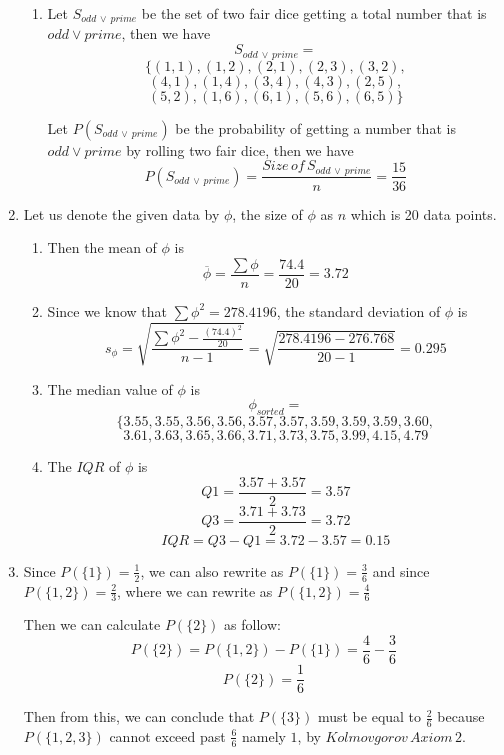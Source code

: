 \documentclass[12pt]{article}
\begin{document}
\begin{enumerate}
\begin{enumerate}
		\item Let $S_{odd \, \lor \, prime}$ be the set of two fair dice getting a total number that is $odd \lor prime$, then we have
		$$S_{odd \, \lor \, prime} =$$ 
		$$\{(1,1), (1,2), (2,1), (2,3), (3,2),$$		
		$$(4,1), (1,4),(3,4), (4,3), (2,5),$$
		$$(5,2), (1,6), (6,1), (5,6),(6,5)\}$$
		
		Let $P(S_{odd \, \lor \, prime})$ be the probability of getting a number that is $odd \lor prime$ by rolling two fair dice, then we have
		$$P(S_{odd \, \lor \, prime}) = \frac{Size \, of \, S_{odd \, \lor \, prime}}{n} = \frac{15}{36}$$
		
	\end{enumerate}
	
	\item Let us denote the given data by $\phi$, the size of $\phi$ as $n$ which is 20 data points.
	
	\begin{enumerate}
	
		\item Then the mean of $\phi$ is
		$$\overline{\phi} = \frac{\sum \phi}{n} = \frac{74.4}{20} = 3.72$$
		
		\item Since we know that $\sum \phi^{2} = 278.4196$, the standard deviation of $\phi$ is
		$$s_{\phi} = \sqrt{\frac{\sum \phi^{2} - \frac{(74.4)^2}{20}}{n-1}}= \sqrt{\frac{278.4196 - 276.768}{20-1}} = 0.295$$
		
		\item The median value of $\phi$ is
		$$\phi_{sorted} =$$	
		$$\{3.55, 3.55, 3.56, 3.56, 3.57, 3.57, 3.59, 3.59, 3.59, 3.60,$$
		$$3.61, 3.63, 3.65, 3.66, 3.71, 3.73, 3.75, 3.99, 4.15, 4.79$$
		
		\item The $IQR$ of $\phi$ is
		$$Q1 = \frac{3.57 + 3.57}{2} = 3.57$$
		$$Q3 = \frac{3.71 + 3.73}{2} = 3.72$$
		$$IQR = Q3 - Q1 = 3.72 - 3.57 = 0.15$$
	\end{enumerate}
		
	\item Since $P(\{1\}) = \frac{1}{2}$, we can also rewrite as $P(\{1\}) = \frac{3}{6}$ and since $P(\{1, 2\}) = \frac{2}{3}$, where we can rewrite as $P(\{1, 2\}) = \frac{4}{6}$
	
	Then we can calculate $P(\{2\})$ as follow:
	$$P(\{2\}) = P(\{1, 2\}) - P(\{1\}) = \frac{4}{6} - \frac{3}{6}$$
	$$P(\{2\}) = \frac{1}{6}$$
	
	Then from this, we can conclude that $P(\{3\})$ must be equal to $\frac{2}{6}$ because $P(\{1, 2, 3\})$ cannot exceed past $\frac{6}{6}$ namely $1$, by $Kolmovgorov \, Axiom \, 2$.


\end{enumerate}
\end{document}
